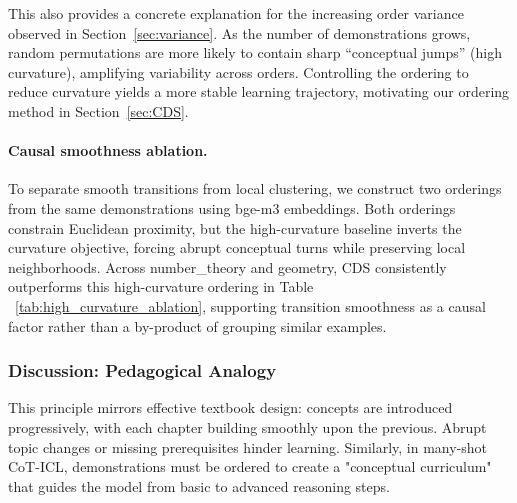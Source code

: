 This also provides a concrete explanation for the increasing order variance observed in Section~\ref{sec:variance}.
As the number of demonstrations grows, random permutations are more likely to contain sharp ``conceptual jumps'' (high curvature), amplifying variability across orders.
Controlling the ordering to reduce curvature yields a more stable learning trajectory, motivating our ordering method in Section~\ref{sec:CDS}.

\paragraph{Causal smoothness ablation.}
To separate smooth transitions from local clustering, we construct two orderings from the same demonstrations using bge-m3 embeddings.
Both orderings constrain Euclidean proximity, but the high-curvature baseline inverts the curvature objective, forcing abrupt conceptual turns while preserving local neighborhoods.
Across number\_theory and geometry, CDS consistently outperforms this high-curvature ordering in Table ~\ref{tab:high_curvature_ablation}, supporting transition smoothness as a causal factor rather than a by-product of grouping similar examples.










\subsubsection{Discussion: Pedagogical Analogy} This principle mirrors effective textbook design: concepts are introduced progressively, with each chapter building smoothly upon the previous. Abrupt topic changes or missing prerequisites hinder learning. Similarly, in many-shot CoT-ICL, demonstrations must be ordered to create a "conceptual curriculum" that guides the model from basic to advanced reasoning steps.






